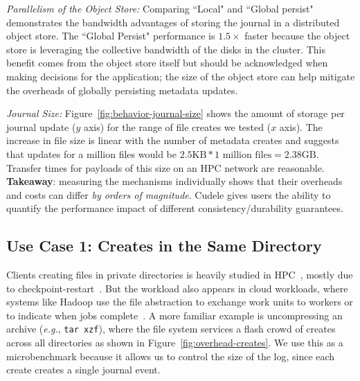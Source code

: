 {\it Parallelism of the Object Store:} Comparing ``Local" and ``Global
persist" demonstrates the bandwidth advantages of storing the journal in a
distributed object store. The ``Global Persist"
performance is \(1.5\times\) faster because the object store is leveraging the
collective bandwidth of the disks in the cluster. This benefit comes from the
object store itself but should be acknowledged when making decisions for the
application; the size of the object store can help mitigate the overheads of
globally persisting metadata updates.

{\it Journal Size:} Figure~\ref{fig:behavior-journal-size} shows the
amount of storage per journal update (\(y\) axis) for the range of file creates
we tested (\(x\) axis). The increase in file size is linear with the number of
metadata creates and suggests that updates for a million files would be
\(2.5\text{KB}*1\text{ million files} = 2.38\text{GB}\). Transfer times for
payloads of this size on an HPC network are reasonable.\\

\noindent\textbf{Takeaway}: measuring the mechanisms individually shows that
their overheads and costs can differ {\it by orders of magnitude}. Cudele gives
users the ability to quantify the performance impact of different
consistency/durability guarantees.\\

\subsection{Use Case 1: Creates in the Same Directory}
\label{sec:use-case-1}

Clients creating files in private directories is heavily studied in
HPC~\cite{weil:sc2004-dyn-metadata, ren:sc2014-indexfs, patil:fast2011-giga,
zheng:pdsw2014-batchfs, sevilla:sc15-mantle}, mostly due to
checkpoint-restart~\cite{bent_plfs_2009}.  But the workload also appears in
cloud workloads, where systems like Hadoop use the file abstraction to exchange
work units to workers or to indicate when jobs
complete~\cite{shvachko:login2012-hdfs-scalability}. A more familiar example is
uncompressing an archive ({\it e.g.}, \texttt{tar xzf}), where the file system
services a flash crowd of creates across all directories as shown in
Figure~\ref{fig:overhead-creates}.  We use this as a microbenchmark because it
allows us to control the size of the log, since each create creates a single
journal event.

